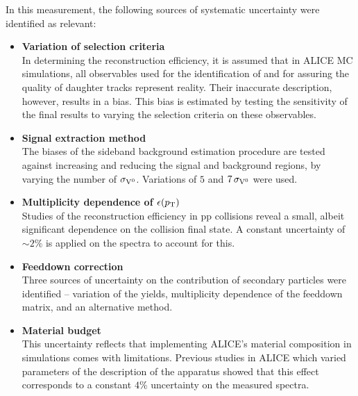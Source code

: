 In this measurement, the following sources of systematic uncertainty were identified as relevant:
\begin{itemize}
\item \textbf{Variation of selection criteria}\\
In determining the reconstruction efficiency, it is assumed that in ALICE MC simulations, all observables used for the identification of \VOs and for assuring the quality of daughter tracks represent reality. Their inaccurate description, however, results in a bias. This bias is estimated by testing the sensitivity of the final results to varying the selection criteria on these observables.
\item \textbf{Signal extraction method}\\
The biases of the sideband background estimation procedure are tested against increasing and reducing the signal and background regions, by varying the number of $\sigma_{\rm V^0}$. Variations of $5$ and $7 \, \sigma_{\rm V^0}$ were used.
\item \textbf{Multiplicity dependence of $\epsilon ( p_{\text{T}} )$}\\
Studies of the reconstruction efficiency in pp collisions reveal a small, albeit significant dependence on the collision final state. A constant uncertainty of $\sim 2 \%$ is applied on the spectra to account for this.
\item \textbf{Feeddown correction}\\ 
Three sources of uncertainty on the contribution of secondary particles were identified -- variation of the \XI yields, multiplicity dependence of the feeddown matrix, and an alternative method.%
\item \textbf{Material budget}\\
This uncertainty reflects that implementing ALICE's material composition in simulations comes with limitations. Previous studies in ALICE \cite{} which varied parameters of the description of the apparatus showed that this effect corresponds to a constant $4\%$ uncertainty on the measured spectra.
\end{itemize}

